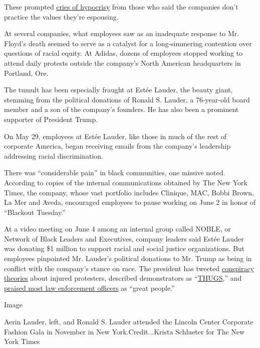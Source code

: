 These prompted
\href{https://www.nytimes3xbfgragh.onion/2020/06/06/business/corporate-america-has-failed-black-america.html?searchResultPosition=1}{cries
of hypocrisy} from those who said the companies don't practice the
values they're espousing.

At several companies, what employees saw as an inadequate response to
Mr. Floyd's death seemed to serve as a catalyst for a long-simmering
contention over questions of racial equity. At Adidas, dozens of
employees stopped working to attend daily protests outside the company's
North American headquarters in Portland, Ore.

The tumult has been especially fraught at Estée Lauder, the beauty
giant, stemming from the political donations of Ronald S. Lauder, a
76-year-old board member and a son of the company's founders. He has
also been a prominent supporter of President Trump.

On May 29, employees at Estée Lauder, like those in much of the rest of
corporate America, began receiving emails from the company's leadership
addressing racial discrimination.

There was ``considerable pain'' in black communities, one missive noted.
According to copies of the internal communications obtained by The New
York Times, the company, whose vast portfolio includes Clinique, MAC,
Bobbi Brown, La Mer and Aveda, encouraged employees to pause working on
June 2 in honor of ``Blackout Tuesday.''

At a video meeting on June 4 among an internal group called NOBLE, or
Network of Black Leaders and Executives, company leaders said Estée
Lauder was donating \$1 million to support racial and social justice
organizations. But employees pinpointed Mr. Lauder's political donations
to Mr. Trump as being in conflict with the company's stance on race. The
president has tweeted
\href{https://www.nytimes3xbfgragh.onion/2020/06/09/nyregion/who-is-martin-gugino-buffalo-police.html}{conspiracy
theories} about injured protesters, described demonstrators as
``\href{https://twitter.com/realDonaldTrump/status/1266231100780744704?s=20}{THUGS},''
and
\href{https://www.nytimes3xbfgragh.onion/2020/06/08/us/politics/defund-police-trump.html}{praised
most law enforcement officers} as ``great people.''

Image

Aerin Lauder, left, and Ronald S. Lauder attended the Lincoln Center
Corporate Fashion Gala in November in New York.Credit...Krista Schlueter
for The New York Times

